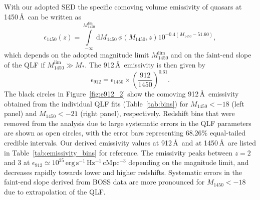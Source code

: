 \documentclass[fleqn,usenatbib]{mnras}
\begin{document}
With our adopted SED the specific comoving volume emissivity of
quasars at 1450\,\AA\ can be written as
\begin{equation}
\epsilon_{1450}\left(z\right)=\int\limits_{-\infty}^{M_{1450}^\mathrm{lim}}\mathrm{d}M_{1450}\,\phi\left(M_{1450},z\right)10^{-0.4\left(M_{1450}-51.60\right)},
\label{eqn:epsilon}
\end{equation}
which depends on the adopted magnitude limit $M_{1450}^\mathrm{lim}$
and on the faint-end slope of the QLF if $M_{1450}^\mathrm{lim}\gg
M_*$.  The 912\,\AA\ emissivity is then given by
\begin{equation}
  \epsilon_{912}=\epsilon_{1450}\times\left(\frac{912}{1450}\right)^{0.61}.
  \label{eqn:epsilon_912}
\end{equation}
The black circles in Figure~\ref{fig:e912_2} show the comoving
912\,\AA\ emissivity obtained from the individual QLF fits
(Table~\ref{tab:bins}) for $M_{1450}<-18$ (left panel) and
$M_{1450}<-21$ (right panel), respectively. Redshift bins that were
removed from the analysis due to large systematic errors in the QLF
parameters are shown as open circles, with the error bars representing
68.26\% equal-tailed credible intervals.  Our derived emissivity
values at 912\,\AA\ and at 1450\,\AA\ are listed in
Table~\ref{tab:emissivity_bins} for reference.  The emissivity peaks
between $z=2$ and 3 at $\epsilon_{912}\simeq 10^{25}\,\mathrm{erg\,
  s^{-1}\, Hz^{-1}\, cMpc^{-3}}$ depending on the magnitude limit, and
decreases rapidly towards lower and higher redshifts.  Systematic
errors in the faint-end slope derived from BOSS data are more
pronounced for $M_{1450}<-18$ due to extrapolation of the QLF.
\end{document}
